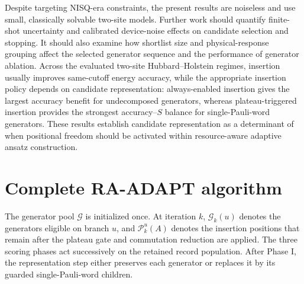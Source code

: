 \documentclass[
  reprint,
  amsmath,
  amssymb,
  aps,
  pra,
  nofootinbib,
  superscriptaddress,
  floatfix
]{revtex4-2}
\begin{document}
Despite targeting NISQ-era constraints, the present results are noiseless and
use small, classically solvable two-site models. Further work should quantify
finite-shot uncertainty and calibrated device-noise effects on candidate
selection and stopping. It should also examine how shortlist size and
physical-response grouping affect the selected generator sequence and the
performance of generator ablation.
Across the evaluated two-site Hubbard--Holstein regimes, insertion usually
improves same-cutoff energy accuracy, while the appropriate insertion policy
depends on candidate representation:
always-enabled insertion gives the largest accuracy benefit for undecomposed
generators, whereas plateau-triggered insertion provides the strongest
accuracy--\(S\) balance for single-Pauli-word generators. These results
establish candidate representation as a determinant of when positional freedom
should be activated within resource-aware adaptive ansatz construction.

\clearpage
\appendix
\section{Complete RA-ADAPT algorithm}
\label{app:complete_algorithm}

The generator pool \(\mathcal G\) is initialized once. At iteration \(k\),
\(\mathcal G_k(u)\) denotes the generators eligible on branch \(u\), and
\(\mathcal P_k^u(A)\) denotes the insertion positions that remain after the
plateau gate and commutation reduction are applied. The three
scoring phases act successively on the retained record population. After Phase
I, the representation step either preserves each generator or replaces it by
its guarded single-Pauli-word children.
\end{document}

